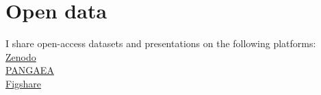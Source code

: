 \documentclass[%
               doublesided,
               paper=a4,
               fontsize=10pt
              ]{my-resume}
\begin{document}
{    \section[\faUnlock]{Open data}
    I share open-access datasets and presentations on the following platforms:\\
    \faExternalLink \hspace{0.5em} \href{https://zenodo.org/search?page=1&size=20&q=creators.orcid:(0000-0001-5575-1168)&sort=mostrecent}{Zenodo}\\
    \faExternalLink \hspace{0.5em} \href{https://www.pangaea.de/?q=Rovere\%2C+Alessio&f.author\%5B\%5D=Rovere\%2C+Alessio}{PANGAEA}\\
    \faExternalLink \hspace{0.5em} \href{https://figshare.com/authors/Alessio_Rovere/1379355}{Figshare}\\
    }
\end{document}
